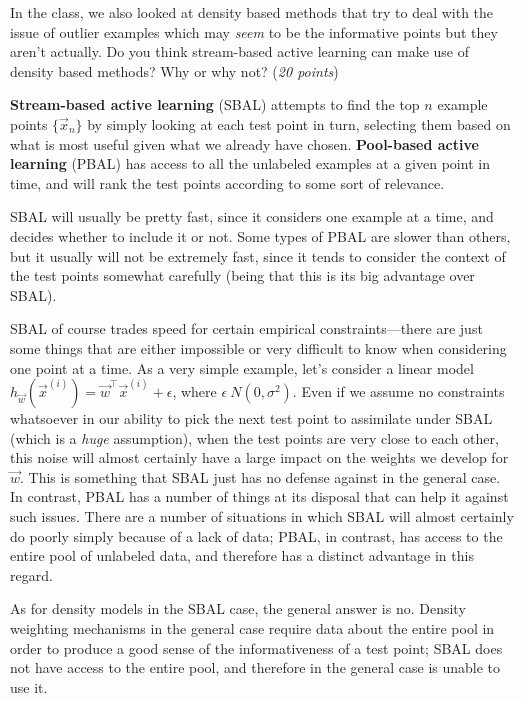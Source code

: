 \documentclass[fleqn]{article}
\begin{document}
In the class, we also looked at density based methods that try to deal
with the issue of outlier examples which may \emph{seem} to be the informative
points but they aren't actually. Do you think stream-based active learning
can make use of density based methods? Why or why not? (\emph{20 points})

\begin{solution}
\textbf{Stream-based active learning} (SBAL) attempts to find the top $n$ example points $\{ \vec{x}_n \}$ by simply looking at each test point in turn, selecting them based on what is most useful given what we already have chosen. \textbf{Pool-based active learning} (PBAL) has access to all the unlabeled examples at a given point in time, and will rank the test points according to some sort of relevance. \linebreak

SBAL will usually be pretty fast, since it considers one example at a time, and decides whether to include it or not. Some types of PBAL are slower than others, but it usually will not be extremely fast, since it tends to consider the context of the test points somewhat carefully (being that this is its big advantage over SBAL). \linebreak

SBAL of course trades speed for certain empirical constraints---there are just some things that are either impossible or very difficult to know when considering one point at a time. As a very simple example, let's consider a linear model $h_{\vec{w}} (\vec{x}^{(i)}) = \vec{w}^\top \vec{x}^{(i)} + \epsilon$, where $\epsilon ~ N(0, \sigma^2)$. Even if we assume no constraints whatsoever in our ability to pick the next test point to assimilate under SBAL (which is a \textit{huge} assumption), when the test points are very close to each other, this noise will almost certainly have a large impact on the weights we develop for $\vec{w}$. This is something that SBAL just has no defense against in the general case. In contrast, PBAL has a number of things at its disposal that can help it against such issues. There are a number of situations in which SBAL will almost certainly do poorly simply because of a lack of data; PBAL, in contrast, has access to the entire pool of unlabeled data, and therefore has a distinct advantage in this regard. \linebreak

As for density models in the SBAL case, the general answer is no. Density weighting mechanisms in the general case require data about the entire pool in order to produce a good sense of the informativeness of a test point; SBAL does not have access to the entire pool, and therefore in the general case is unable to use it.
\end{solution}
\end{document}

